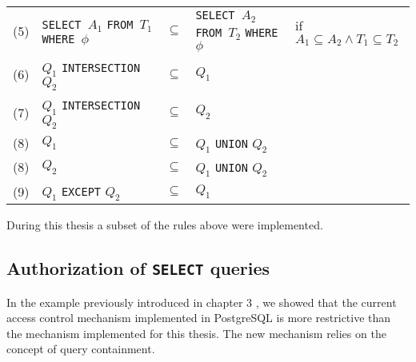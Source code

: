 {\begin{center}
\begin{longtable}{ p{5mm} p{40mm} p{5mm} p{25mm} p{25mm} }
	(5) \label{proj2} &
	\texttt{SELECT $A_1$} \newline
	\texttt{FROM $T_1$} \newline
	\texttt{WHERE $\phi$} &
	$\subseteq$ &
	\texttt{SELECT $A_2$} \newline
	\texttt{FROM $T_2$} \newline
	\texttt{WHERE $\phi$}&
	if $A_1 \subseteq A_2 \land T_1 \subseteq T_2$
	\\
	
	(6) \label{intersect1} &
	$Q_1$ \texttt{INTERSECTION} $Q_2$ &
	$\subseteq$ &
	$Q_1$&
	\\
	
	(7) \label{intersect2} &
	$Q_1$ \texttt{INTERSECTION} $Q_2$ &
	$\subseteq$ &
	$Q_2$&
	\\
	
	(8) \label{union1} &
	$Q_1$&
	$\subseteq$ &
	$Q_1$ \texttt{UNION} $Q_2$ &
	\\
	
	(8) \label{union2} &
	$Q_2$&
	$\subseteq$ &
	$Q_1$ \texttt{UNION} $Q_2$ &
	\\
	
	(9) \label{except} &
	$Q_1$ \texttt{EXCEPT} $Q_2$ &
	$\subseteq$ &
	$Q_1$&
	\\
	\end{longtable}
\end{center}


During this thesis a subset of the rules above were implemented. 

\subsection{Authorization of \texttt{SELECT} queries}

In the example previously introduced in chapter 3 , we showed that the current access control mechanism implemented in PostgreSQL is   more restrictive than the mechanism implemented for this thesis.
%
The new mechanism relies on the concept of query containment.
%

}
